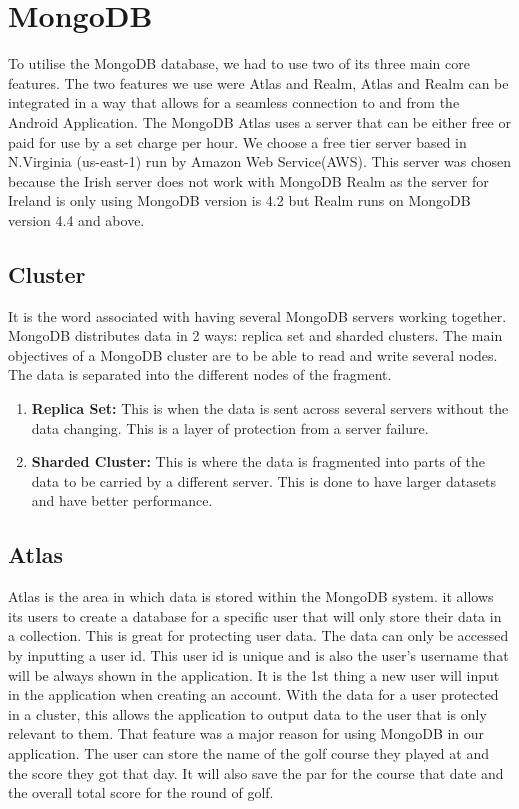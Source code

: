 \section{MongoDB}
To utilise the MongoDB database, we had to use two of its three main core features. The two features we use were Atlas and Realm, Atlas and Realm can be integrated in a way that allows for a seamless connection to and from the Android Application. The MongoDB Atlas uses a server that can be either free or paid for use by a set charge per hour. We choose a free tier server based in N.Virginia (us-east-1) run by Amazon Web Service(AWS). This server was chosen because the Irish server does not work with MongoDB Realm as the server for Ireland is only using MongoDB version is 4.2 but Realm runs on MongoDB version 4.4 and above.
\subsection{Cluster}
It is the word associated with having several MongoDB servers working together. MongoDB distributes data in 2 ways: replica set and sharded clusters. The main objectives of a MongoDB cluster are to be able to read and write several nodes. The data is separated into the different nodes of the fragment.
\begin{enumerate}
    \item \textbf{Replica Set:}
    \newline This is when the data is sent across several servers without the data changing. This is a layer of protection from a server failure.
    \item \textbf{Sharded Cluster:}
    \newline  This is where the data is fragmented into parts of the data to be carried by a different server. This is done to have larger datasets and have better performance.
\end{enumerate}
\subsection{Atlas}
Atlas is the area in which data is stored within the MongoDB system. it allows its users to create a database for a specific user that will only store their data in a collection. \newline
This is great for protecting user data. The data can only be accessed by inputting a user id. This user id is unique and is also the user’s username that will be always shown in the application. It is the 1st thing a new user will input in the application when creating an account. With the data for a user protected in a cluster, this allows the application to output data to the user that is only relevant to them. That feature was a major reason for using MongoDB in our application.
\newline
The user can store the name of the golf course they played at and the score they got that day. It will also save the par for the course that date and the overall total score for the round of golf.

